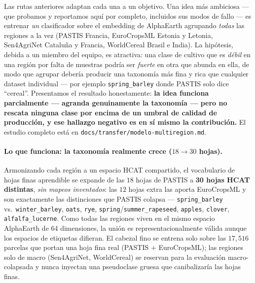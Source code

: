 Las rutas anteriores adaptan cada una a un objetivo. Una idea más
ambiciosa --- que probamos y reportamos aquí por completo, incluidos sus
modos de fallo --- es entrenar \emph{un} clasificador sobre el embedding
de AlphaEarth agrupando \emph{todas} las regiones a la vez (PASTIS
Francia, EuroCropsML Estonia y Letonia, Sen4AgriNet Cataluña y Francia,
WorldCereal Brasil e India). La hipótesis, debida a un miembro del
equipo, es atractiva: una clase de cultivo que es \emph{débil} en una
región por falta de muestras podría ser \emph{fuerte} en otra que abunda
en ella, de modo que agrupar debería producir una taxonomía más fina y
rica que cualquier dataset individual --- por ejemplo
\texttt{spring\_barley} donde PASTIS solo dice ``cereal''. Presentamos el
resultado honestamente: \textbf{la idea funciona parcialmente --- agranda
genuinamente la taxonomía --- pero no rescata ninguna clase por encima de
un umbral de calidad de producción, y ese hallazgo negativo es en sí
mismo la contribución.} El estudio completo está en
\texttt{docs/transfer/modelo-multiregion.md}.

\paragraph{Lo que funciona: la taxonomía realmente crece ($18\rightarrow30$ hojas).}
Armonizando cada región a un espacio HCAT compartido, el vocabulario de
hojas finas aprendible se expande de las $18$ hojas de PASTIS a
\textbf{30 hojas HCAT distintas}, \emph{sin mapeos inventados}: las $12$
hojas extra las aporta EuroCropsML y son exactamente las distinciones que
PASTIS colapsa --- \texttt{spring\_barley} vs.\ \texttt{winter\_barley},
\texttt{oats}, \texttt{rye}, \texttt{spring}/\texttt{summer\_rapeseed},
\texttt{apples}, \texttt{clover}, \texttt{alfalfa\_lucerne}. Como todas
las regiones viven en el mismo espacio AlphaEarth de 64 dimensiones, la
unión es representacionalmente válida aunque los espacios de etiquetas
difieran. El cabezal fino se entrena solo sobre las $17{,}516$ parcelas
que portan una hoja fina real (PASTIS $+$ EuroCropsML); las regiones solo
de macro (Sen4AgriNet, WorldCereal) se reservan para la evaluación
macro-colapsada y nunca inyectan una pseudoclase gruesa que canibalizaría
las hojas finas.

